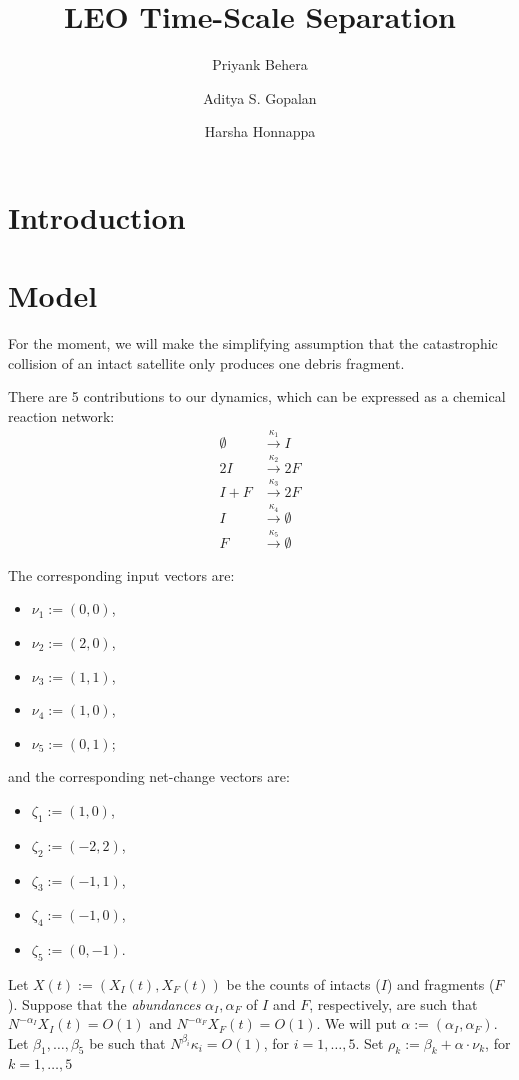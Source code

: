 \documentclass{article}
\title{LEO Time-Scale Separation}
\author{Priyank Behera \and Aditya S. Gopalan \and Harsha Honnappa}
\date{}
\begin{document}
\maketitle

\section{Introduction}

\section{Model}
For the moment, we will make the simplifying assumption that the catastrophic collision of an intact satellite only produces one debris fragment.

There are 5 contributions to our dynamics, which can be expressed as a chemical reaction network:
\begin{align}
    \emptyset &\xrightarrow{\kappa_1} I 
    \label{eq:rxn1}
    \\
    2I &\xrightarrow{\kappa_2} 2F
    \label{eq:rxn2}
    \\
    I + F &\xrightarrow{\kappa_3} 2F
    \label{eq:rxn3}
    \\
    I &\xrightarrow{\kappa_4} \emptyset
    \label{eq:rxn4}
    \\
    F &\xrightarrow{\kappa_5} \emptyset
    \label{eq:rxn5}
\end{align}

The corresponding input vectors are:
\begin{itemize}
    \item $\nu_1 := (0, 0)$,
    \item $\nu_2 := (2, 0)$,
    \item $\nu_3 := (1, 1)$,
    \item $\nu_4 := (1, 0)$,
    \item $\nu_5 := (0, 1)$;
\end{itemize}
and the corresponding net-change vectors are:
\begin{itemize}
    \item $\zeta_1 := (1, 0)$,
    \item $\zeta_2 := (-2, 2)$,
    \item $\zeta_3 := (-1, 1)$,
    \item $\zeta_4 := (-1, 0)$,
    \item $\zeta_5 := (0, -1)$.
\end{itemize}

Let $X(t) := (X_I(t), X_F(t))$ be the counts of intacts ($I$) and fragments ($F$).
Suppose that the \emph{abundances} $\alpha_I, \alpha_F$ of $I$ and $F$, respectively, are such that $N^{-\alpha_I}X_I(t) = O(1)$ and $N^{-\alpha_F}X_F(t) = O(1)$.
We will put $\alpha := (\alpha_I, \alpha_F)$.
Let $\beta_1, \ldots, \beta_5$ be such that $N^{\beta_i}\kappa_i = O(1)$, for $i = 1, \ldots,  5$.
Set $\rho_k := \beta_k + \alpha\cdot\nu_k$, for $k = 1, \ldots, 5$
\end{document}
